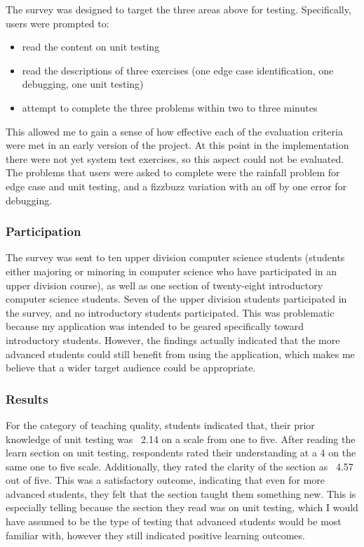 \documentclass[10pt,twocolumn]{article}
\begin{document}
The survey was designed to target the three areas above for testing. Specifically, users were prompted to:

\begin{itemize}
    \item read the content on unit testing
    \item read the descriptions of three exercises (one edge case identification, one debugging, one unit testing)
    \item attempt to complete the three problems within two to three minutes
\end{itemize}

This allowed me to gain a sense of how effective each of the evaluation criteria were met in an early version of the project.
At this point in the implementation there were not yet system test exercises, so this aspect could not be evaluated. The 
problems that users were asked to complete were the rainfall problem for edge case and unit testing, and a fizzbuzz 
variation with an off by one error for debugging. 

\subsubsection{Participation}

The survey was sent to ten upper division computer science students (students either majoring or minoring in computer science
who have participated in an upper division course), as well as one section of twenty-eight introductory computer science students.
Seven of the upper division students participated in the survey, and no introductory students participated. This was problematic 
because my application was intended to be geared specifically toward introductory students. However, the findings actually 
indicated that the more advanced students could still benefit from using the application, which makes me believe that a wider 
target audience could be appropriate.

\subsubsection{Results}

For the category of teaching quality, students indicated that, their 
prior knowledge of unit testing was ~2.14 on a scale from one to five. After reading the learn section on unit testing, 
respondents rated their understanding at a 4 on the same one to five scale. Additionally, they rated the clarity of the 
section as ~4.57 out of five. This was a satisfactory outcome, indicating that even for more advanced students, they felt 
that the section taught them something new. This is especially telling because the section they read was on unit testing, 
which I would have assumed to be the type of testing that advanced students would be most familiar with, however they still
indicated positive learning outcomes. 
\end{document}
